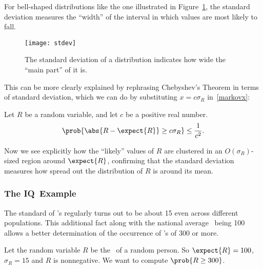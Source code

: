 For bell-shaped distributions like the one illustrated in
Figure~\ref{fig:stdev}, the standard deviation measures the ``width''
of the interval in which values are most likely to fall.
\begin{figure}
  \centerline{\texttt{[image: stdev]}}
  \caption{The standard deviation of a distribution indicates how wide the
    ``main part'' of it is.}
  \label{fig:stdev}
\end{figure}
This can be more clearly explained by rephrasing Chebyshev's Theorem
in terms of standard deviation, which we can do by substituting $x = c
\sigma_R$ in~\eqref{markovx}:
\begin{corollary}\label{cor:cheby}
Let $R$ be a random variable, and let $c$ be a positive real number.
\begin{equation}\label{markovcexp}
\prob{\abs{R - \expect{R}} \geq c \sigma_R} \leq \frac{1}{c^2}.
\end{equation}
\end{corollary}
Now we see explicitly how the ``likely'' values of $R$ are clustered
in an $O(\sigma_R)$-sized region around $\expect{R}$, confirming that
the standard deviation measures how spread out the distribution of $R$
is around its mean.

\iffalse
\begin{proof}
  Substituting $x = c \sigma_R$ in~\eqref{markovx} gives:
  \begin{displaymath}
    \prob{\card{R - \expect{R}} \geq c \sigma_R}
    \leq
    \frac{\variance{R}}{(c \sigma_R)^2}
    =  \frac{\sigma_R^2}{(c \sigma_R)^2}
    = \frac{1}{c^2}.
  \end{displaymath}


\end{proof}

\fi

\subsubsection{The IQ\ Example}\label{IQsec}

The standard  of \IQ's regularly turns out to
be about 15 even across different populations.  This additional fact
along with the national average \idx{\IQ}\ being 100 allows a better
determination of the occurrence of \IQ's of 300 or more.

Let the random variable $R$ be the \IQ\ of a random person.  So
$\expect{R} = 100$, $\sigma_R = 15$ and $R$ is nonnegative.  We want
to compute $\prob{R \geq 300}$.

